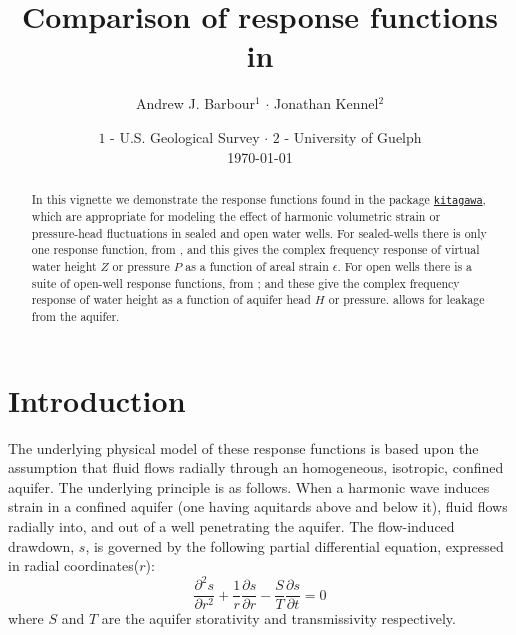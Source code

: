 \documentclass[12pt]{article}
\author{Andrew J. Barbour$^1$ $\cdot$ Jonathan Kennel$^2$}
\title{Comparison of response functions in \kit{}}
\date{%
    \footnotesize{$1$ - U.S. Geological Survey $\cdot$ $2$ - University of Guelph}\\[2ex]%
    \today
}
\begin{document}

%
\newcommand{\SC}[1]{\textsc{#1}}
\newcommand{\Rcmd}[1]{\texttt{#1}}
\newcommand{\kit}[0]{\href{https://github.com/abarbour/kitagawa/}{\color{blue}\Rcmd{kitagawa}}}
\newcommand{\bidxa}[1]{\index{#1}{\textbf{#1}}} 
\newcommand{\bidxb}[2]{\index{#2}{\textbf{#1}}} 
\newcommand{\idxa}[1]{\index{#1}{#1}} 
\newcommand{\idxb}[2]{\index{#2}{#1}} 
%
\maketitle
%
\begin{abstract}
In this vignette we demonstrate the response functions found in 
the package
\kit{}, which are appropriate for modeling the effect of
harmonic volumetric strain or pressure-head fluctuations in
sealed and open water wells.
For sealed-wells there is only one response function, from
\citet{kitagawa2011}, and this gives the complex frequency response of
virtual water height $Z$ or pressure $P$ as a function of
areal %
strain $\epsilon$.
For open wells there is
a suite of open-well response functions, from 
\citet{cooper1965, hsieh1987, rojstaczer1988, liu1989, wang2018}; and
these give the complex frequency response of
water height as a function of aquifer head $H$ or pressure. \citet{wang2018}
allows for leakage from the aquifer.
\end{abstract}
%
\tableofcontents

\section{Introduction}

 The underlying physical model of these response functions
 is based upon the assumption that fluid flows radially
 through an homogeneous, isotropic, confined aquifer.
%
 The underlying principle is as follows.  When a harmonic wave induces
 strain in a confined aquifer (one having aquitards above and below it), 
 fluid flows radially into, and out of a well penetrating the aquifer.
 The flow-induced drawdown, $s$, is governed by the following 
 partial differential equation, expressed in radial coordinates($r$):
\begin{equation}
 \frac{\partial^2 s}{\partial r^2} + \frac{1}{r} 
 \frac{\partial s}{ \partial r} - \frac{S}{T}\frac{\partial s}{\partial t} = 0
\end{equation}
 where $S$ and $T$ are the aquifer storativity and transmissivity respectively.
 
\end{document}
